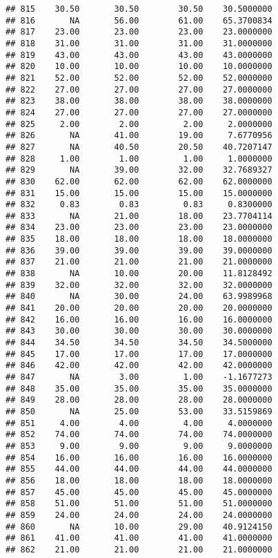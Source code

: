 \documentclass[
]{article}
\begin{document}
\begin{verbatim}
## 815    30.50       30.50        30.50    30.5000000
## 816       NA       56.00        61.00    65.3700834
## 817    23.00       23.00        23.00    23.0000000
## 818    31.00       31.00        31.00    31.0000000
## 819    43.00       43.00        43.00    43.0000000
## 820    10.00       10.00        10.00    10.0000000
## 821    52.00       52.00        52.00    52.0000000
## 822    27.00       27.00        27.00    27.0000000
## 823    38.00       38.00        38.00    38.0000000
## 824    27.00       27.00        27.00    27.0000000
## 825     2.00        2.00         2.00     2.0000000
## 826       NA       41.00        19.00     7.6770956
## 827       NA       40.50        20.50    40.7207147
## 828     1.00        1.00         1.00     1.0000000
## 829       NA       39.00        32.00    32.7689327
## 830    62.00       62.00        62.00    62.0000000
## 831    15.00       15.00        15.00    15.0000000
## 832     0.83        0.83         0.83     0.8300000
## 833       NA       21.00        18.00    23.7704114
## 834    23.00       23.00        23.00    23.0000000
## 835    18.00       18.00        18.00    18.0000000
## 836    39.00       39.00        39.00    39.0000000
## 837    21.00       21.00        21.00    21.0000000
## 838       NA       10.00        20.00    11.8128492
## 839    32.00       32.00        32.00    32.0000000
## 840       NA       30.00        24.00    63.9989968
## 841    20.00       20.00        20.00    20.0000000
## 842    16.00       16.00        16.00    16.0000000
## 843    30.00       30.00        30.00    30.0000000
## 844    34.50       34.50        34.50    34.5000000
## 845    17.00       17.00        17.00    17.0000000
## 846    42.00       42.00        42.00    42.0000000
## 847       NA        3.00         1.00    -1.1677273
## 848    35.00       35.00        35.00    35.0000000
## 849    28.00       28.00        28.00    28.0000000
## 850       NA       25.00        53.00    33.5159869
## 851     4.00        4.00         4.00     4.0000000
## 852    74.00       74.00        74.00    74.0000000
## 853     9.00        9.00         9.00     9.0000000
## 854    16.00       16.00        16.00    16.0000000
## 855    44.00       44.00        44.00    44.0000000
## 856    18.00       18.00        18.00    18.0000000
## 857    45.00       45.00        45.00    45.0000000
## 858    51.00       51.00        51.00    51.0000000
## 859    24.00       24.00        24.00    24.0000000
## 860       NA       10.00        29.00    40.9124150
## 861    41.00       41.00        41.00    41.0000000
## 862    21.00       21.00        21.00    21.0000000

\end{verbatim}
\end{document}
